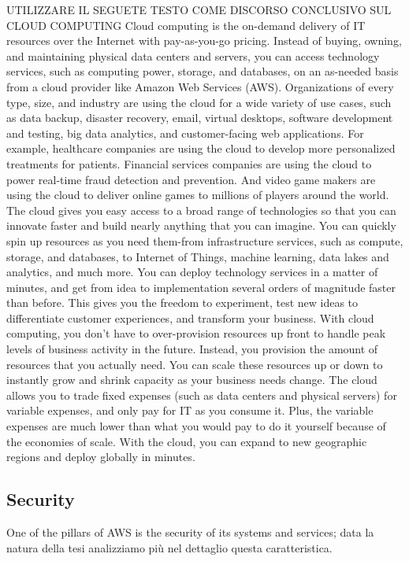 UTILIZZARE IL SEGUETE TESTO COME DISCORSO CONCLUSIVO SUL CLOUD COMPUTING
Cloud computing is the on-demand delivery of IT resources over the Internet with pay-as-you-go pricing. Instead of buying, owning, and maintaining physical data centers and servers, you can access technology services, such as computing power, storage, and databases, on an as-needed basis from a cloud provider like Amazon Web Services (AWS). Organizations of every type, size, and industry are using the cloud for a wide variety of use cases, such as data backup, disaster recovery, email, virtual desktops, software development and testing, big data analytics, and customer-facing web applications. For example, healthcare companies are using the cloud to develop more personalized treatments for patients. Financial services companies are using the cloud to power real-time fraud detection and prevention. And video game makers are using the cloud to deliver online games to millions of players around the world. 
The cloud gives you easy access to a broad range of technologies so that you can innovate faster and build nearly anything that you can imagine. You can quickly spin up resources as you need them-from infrastructure services, such as compute, storage, and databases, to Internet of Things, machine learning, data lakes and analytics, and much more. You can deploy technology services in a matter of minutes, and get from idea to implementation several orders of magnitude faster than before. This gives you the freedom to experiment, test new ideas to differentiate customer experiences, and transform your business.
With cloud computing, you don't have to over-provision resources up front to handle peak levels of business activity in the future. Instead, you provision the amount of resources that you actually need. You can scale these resources up or down to instantly grow and shrink capacity as your business needs change.
The cloud allows you to trade fixed expenses (such as data centers and physical servers) for variable expenses, and only pay for IT as you consume it. Plus, the variable expenses are much lower than what you would pay to do it yourself because of the economies of scale. 
With the cloud, you can expand to new geographic regions and deploy globally in minutes.





\subsection{Security}
One of the pillars of AWS is the security of its systems and services; data la natura della tesi analizziamo più nel dettaglio questa caratteristica.

